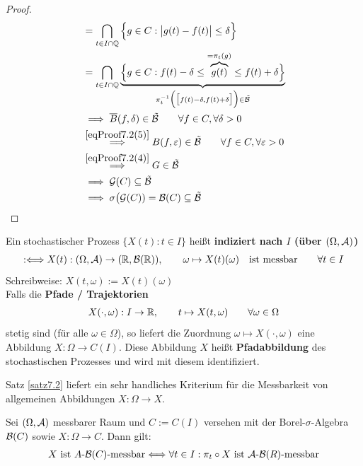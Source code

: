 \begin{proof}
\begin{align*}
		&=\bigcap\limits_{t\in I\cap\mathbb{Q}}\Big\lbrace g\in C:\big|g(t)-f(t)\big|\leq\delta\Big\rbrace\\
		&=\bigcap\limits_{t\in I\cap\mathbb{Q}}\underbrace{\Big\lbrace g\in C:f(t)-\delta\leq \overbrace{g(t)}^{=\pi_t(g)}\leq f(t)+\delta\Big\rbrace}_{\pi_t^{-1}\Big(\big[f(t)-\delta,f(t)+\delta\big]\Big)\in\tilde{\mathcal{B}}}\\
		&\implies
		\overline{B}(f,\delta)\in\tilde{\mathcal{B}}\qquad\forall f\in C,\forall\delta>0\\
		&\stackrel{\eqref{eqProof7.2(5)}}{\implies}
		B(f,\varepsilon)\in\tilde{\mathcal{B}}\qquad\forall f\in C,\forall\varepsilon>0\\
		&\stackrel{\eqref{eqProof7.2(4)}}{\implies}
		G\in\tilde{\mathcal{B}}\\
		&\implies
		\mathcal{G}(C)\subseteq\tilde{\mathcal{B}}\\
		&\implies\sigma\big(\mathcal{G}(C))=\mathcal{B}(C)\subseteq\tilde{\mathcal{B}}
	\end{align*}
\end{proof}

\begin{defi}
	Ein stochastischer Prozess $\big\lbrace X(t):t\in I\big\rbrace$ heißt \textbf{indiziert nach $I$ (über $(\Omega,\mathcal{A})$)}
		\begin{align*}
	:\Longleftrightarrow X(t):(\Omega,\mathcal{A})\to(\mathbb{R},\mathcal{B}(\mathbb{R})),
		\qquad\omega\mapsto X(t)(\omega)\quad
		\text{ist messbar}\qquad\forall t\in I
	\end{align*}
	Schreibweise: $X(t,\omega):=X(t)(\omega)$\\
	Falls die \textbf{Pfade / Trajektorien}
	\begin{align*}
		X(\cdot,\omega):I\to\mathbb{R},\qquad t\mapsto X(t,\omega)\qquad\forall \omega\in\Omega
	\end{align*}
	stetig sind (für alle $\omega\in\Omega$), so liefert die Zuordnung $\omega\mapsto X(\cdot,\omega)$ eine Abbildung $X:\Omega\to C(I)$. 
	Diese Abbildung $X$ heißt \textbf{Pfadabbildung} des stochastischen Prozesses und wird mit diesem identifiziert.
\end{defi}

Satz \ref{satz7.2} liefert ein sehr handliches Kriterium für die Messbarkeit von allgemeinen Abbildungen $X:\Omega\to X$.

\begin{satz}\label{satz7.3}
	Sei $(\Omega,\mathcal{A})$ messbarer Raum und $C:=C(I)$ versehen mit der Borel-$\sigma$-Algebra $\mathcal{B}(C)$ sowie $X:\Omega\to C$. Dann gilt:
	\begin{align*}
		X\text{ ist }A\text{-}\mathcal{B}(C)\text{-messbar}\Longleftrightarrow\forall t\in I:\pi_t\circ X\text { ist }\mathcal{A}\text{-}\mathcal{B}(R)\text{-messbar}
	\end{align*}
\end{satz}

